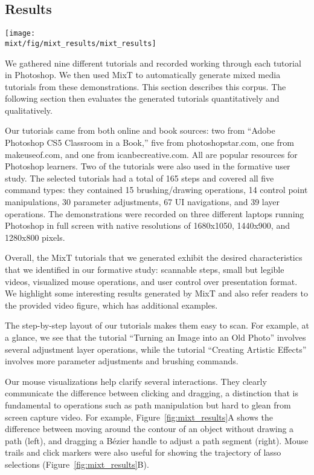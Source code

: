 \subsection{Results}

\begin{figure*}[!t]
  \centering
  \texttt{[image: \\mixt/fig/mixt\_results/mixt\_results]}
  \caption{Automatically-generated MixT results.}
  \label{fig:mixt_results}
\end{figure*}

We gathered nine different tutorials and recorded working through each tutorial in Photoshop. We then used MixT to automatically generate mixed media tutorials from these demonstrations. This section describes this corpus. The following section then evaluates the generated tutorials quantitatively and qualitatively.

Our tutorials came from both online and book sources: two from ``Adobe Photoshop CS5 Classroom in a Book,'' five from photoshopstar.com, one from makeuseof.com, and one from icanbecreative.com. All are popular resources for Photoshop learners. Two of the tutorials were also used in the formative user study. The selected tutorials had a total of 165 steps and covered all five command types: they contained 15 brushing/drawing operations, 14 control point manipulations, 30 parameter adjustments, 67 UI navigations, and 39 layer operations. The demonstrations were recorded on three different laptops running Photoshop in full screen with native resolutions of 1680x1050, 1440x900, and 1280x800 pixels.

Overall, the MixT tutorials that we generated exhibit the desired characteristics that we identified in our formative study: scannable steps, small but legible videos, visualized mouse operations, and user control over presentation format. We highlight some interesting results generated by MixT and also refer readers to the provided video figure, which has additional examples.

 The step-by-step layout of our tutorials makes them easy to scan. For example, at a glance, we see that the tutorial ``Turning an Image into an Old Photo'' involves several adjustment layer operations, while the tutorial ``Creating Artistic Effects'' involves more parameter adjustments and brushing commands.

 Our mouse visualizations help clarify several interactions. They clearly communicate the difference between clicking and dragging, a distinction that is fundamental to operations such as path manipulation but hard to glean from screen capture video. For example, Figure~\ref{fig:mixt_results}A shows the difference between moving around the contour of an object without drawing a path (left), and dragging a Bézier handle to adjust a path segment (right). Mouse trails and click markers were also useful for showing the trajectory of lasso selections (Figure~\ref{fig:mixt_results}B).


